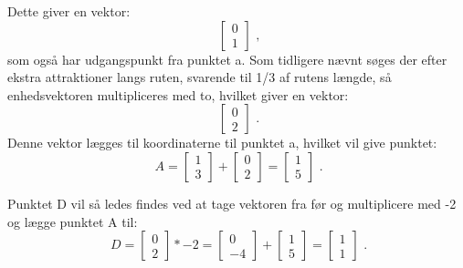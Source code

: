 Dette giver en vektor: 
\[\ \begin{bmatrix} 0 \\ 1 \end{bmatrix} \text{ ,} \]
som også har udgangspunkt fra punktet a. Som tidligere nævnt søges der efter ekstra attraktioner langs ruten, svarende til 1/3 af rutens længde, så enhedsvektoren multipliceres med to, hvilket giver en vektor: 
\[\ \begin{bmatrix} 0 \\ 2 \end{bmatrix} \textbf{ .} \]
Denne vektor lægges til koordinaterne til punktet a, hvilket vil give punktet:
\[\ A = \begin{bmatrix} 1 \\ 3 \end{bmatrix} + \begin{bmatrix} 0 \\ 2 \end{bmatrix} = \begin{bmatrix} 1 \\ 5 \end{bmatrix} \text{ .} \]

Punktet D vil så ledes findes  ved at tage vektoren fra før og multiplicere med -2 og lægge punktet A til:
\[\ D = \begin{bmatrix} 0 \\ 2 \end{bmatrix} * -2 = \begin{bmatrix} 0 \\ -4 \end{bmatrix} + \begin{bmatrix} 1 \\ 5 \end{bmatrix} = \begin{bmatrix} 1 \\ 1 \end{bmatrix} \text{ .} \]



